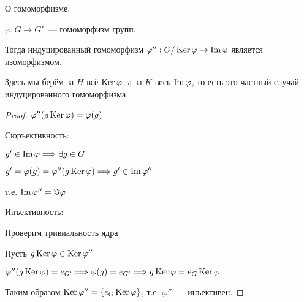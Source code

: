 \begin{theorem}
    О гомоморфизме.

    $\varphi: G \to G'$~--- гомоморфизм групп.
    
    Тогда индуцированный гомоморфизм
    $\varphi'': G / \operatorname{Ker} \varphi \to \operatorname{Im} \varphi$
    является изоморфизмом.
    
    Здесь мы берём за $H$ всё $\operatorname{Ker} \varphi$, а за $K$ весь $\operatorname{Im} \varphi$,
    то есть это частный случай индуцированного гомоморфизма.

    \begin{proof}
        $\varphi''(g\operatorname{Ker} \varphi) = \varphi(g)$

        Сюръективность:

        $g' \in \operatorname{Im} \varphi \Longrightarrow \exists g \in G$

        $g' = \varphi(g) = \varphi''(g \operatorname{Ker} \varphi) \Longrightarrow g' \in \operatorname{Im} \varphi''$

        т.е. $\operatorname{Im} \varphi'' = \Im \varphi $

        Инъективность:

        Проверим тривиальность ядра

        Пусть $g \operatorname{Ker} \varphi \in \operatorname{Ker} \varphi''$

        $\varphi''(g  \operatorname{Ker} \varphi ) = e_{G'} \Longrightarrow \varphi(g) = e_{G'} \Longrightarrow g \operatorname{Ker} \varphi = e_{G} \operatorname{Ker} \varphi$

        Таким образом $\operatorname{Ker} \varphi'' = \{ e_{G} \operatorname{Ker} \varphi \}$, т.е. $\varphi''$~--- инъективен.
        
    \end{proof}
\end{theorem}

